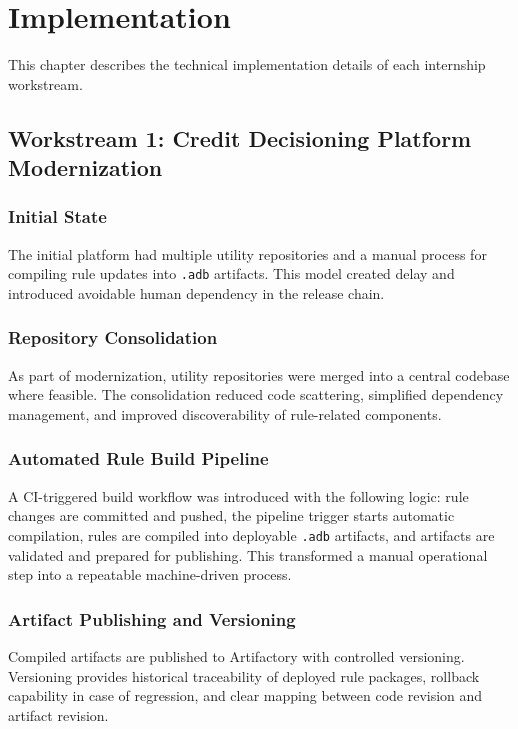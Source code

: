 \chapter{Implementation}

This chapter describes the technical implementation details of each internship workstream.

\section{Workstream 1: Credit Decisioning Platform Modernization}

\subsection{Initial State}

The initial platform had multiple utility repositories and a manual process for compiling rule updates into \texttt{.adb} artifacts. This model created delay and introduced avoidable human dependency in the release chain.

\subsection{Repository Consolidation}

As part of modernization, utility repositories were merged into a central codebase where feasible. The consolidation reduced code scattering, simplified dependency management, and improved discoverability of rule-related components.

\subsection{Automated Rule Build Pipeline}

A CI-triggered build workflow was introduced with the following logic: rule changes are committed and pushed, the pipeline trigger starts automatic compilation, rules are compiled into deployable \texttt{.adb} artifacts, and artifacts are validated and prepared for publishing. This transformed a manual operational step into a repeatable machine-driven process.

\subsection{Artifact Publishing and Versioning}

Compiled artifacts are published to Artifactory with controlled versioning. Versioning provides historical traceability of deployed rule packages, rollback capability in case of regression, and clear mapping between code revision and artifact revision.


